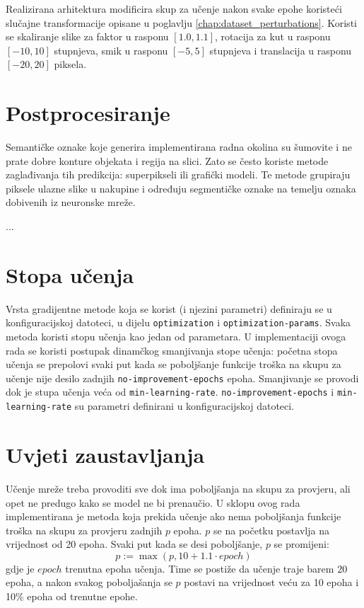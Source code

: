 \documentclass[times, utf8, diplomski, numeric]{fer}
\begin{document}
Realizirana arhitektura modificira skup za učenje nakon svake epohe koristeći slučajne transformacije opisane u poglavlju \ref{chap:dataset_perturbations}. Koristi se skaliranje slike za faktor u rasponu $[1.0, 1.1]$, rotacija za kut u rasponu $[-10, 10]$ stupnjeva, smik u rasponu $[-5, 5]$ stupnjeva i translacija u rasponu $[-20, 20]$ piksela.


\section{Postprocesiranje}

Semantičke oznake koje generira implementirana radna okolina su šumovite i ne prate dobre konture objekata i regija na slici. Zato se često koriste metode zaglađivanja tih predikcija: superpikseli ili grafički modeli. Te metode grupiraju piksele ulazne slike u nakupine i određuju segmentičke oznake na temelju oznaka dobivenih iz neuronske mreže.

...

\section{Stopa učenja}

Vrsta gradijentne metode koja se korist (i njezini parametri) definiraju se u konfiguracijskoj datoteci, u dijelu \texttt{optimization} i \texttt{optimization-params}. Svaka metoda koristi stopu učenja kao jedan od parametara. U implementaciji ovoga rada se koristi postupak dinamčkog smanjivanja stope učenja: početna stopa učenja se prepolovi svaki put kada se poboljšanje funkcije troška na skupu za učenje  nije desilo zadnjih \texttt{no-improvement-epochs} epoha. Smanjivanje se provodi dok je stupa učenja veća od \texttt{min-learning-rate}. \texttt{no-improvement-epochs} i \texttt{min-learning-rate} su parametri definirani u konfiguracijskoj datoteci.

\section{Uvjeti zaustavljanja}
Učenje mreže treba provoditi sve dok ima poboljšanja na skupu za provjeru, ali opet ne predugo kako se model ne bi prenaučio. U sklopu ovog rada implementirana je metoda koja prekida učenje ako nema poboljšanja funkcije troška na skupu za provjeru  zadnjih $p$ epoha. $p$ se na početku postavlja na vrijednost od 20 epoha. Svaki put kada se desi poboljšanje, $p$ se promijeni:
\begin{equation}
  p := \max \left( p, 10 + 1.1 \cdot epoch \right)
\end{equation}
gdje je $epoch$ trenutna epoha učenja. Time se postiže da učenje traje barem 20 epoha, a nakon svakog poboljašanja se $p$ postavi na vrijednost veću za 10 epoha i 10\% epoha od trenutne epohe.
\end{document}
